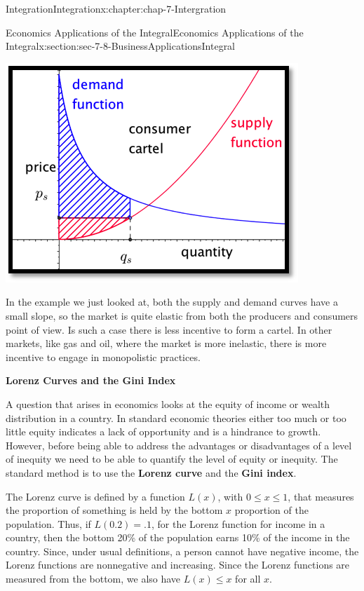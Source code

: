 \documentclass[oneside,10pt,]{book}
\newcommand{\terminology}[1]{\textbf{#1}}
\numberwithin{equation}{section}
\begin{document}
\begin{chapterptx}{Integration}{}{Integration}{}{}{x:chapter:chap-7-Intergration}
\begin{sectionptx}{Economics Applications of the Integral}{}{Economics Applications of the Integral}{}{}{x:section:sec-7-8-BusinessApplicationsIntegral}
\begin{sidebyside}{1}{0.2}{0.2}{0}
\begin{sbspanel}{0.6}
\includegraphics[width=\linewidth]{images/sec7-8-14.png}
\end{sbspanel}%
\end{sidebyside}%
\par
In the example we just looked at, both the supply and demand curves have a small slope, so the market is quite elastic from both the producers and consumers point of view.  Is such a case there is less incentive to form a cartel.  In other markets, like gas and oil, where the market is more inelastic, there is more incentive to engage in monopolistic practices.%
\par
\terminology{Lorenz Curves and the Gini Index}%
\par
A question that arises in economics looks at the equity of income or wealth distribution in a country.  In standard economic theories either too much or too little equity indicates a lack of opportunity and is a hindrance to growth.  However, before being able to address the advantages or disadvantages of a level of inequity we need to be able to quantify the level of equity or inequity.  The standard method is to use the \terminology{Lorenz curve} and the \terminology{Gini index}.%
\par
The Lorenz curve is defined by a function \(L(x)\), with \(0\le x\le 1\), that measures the proportion of something is held by the bottom \(x\) proportion of the population.  Thus, if \(L(0.2)=.1\), for the Lorenz function for income in a country, then the bottom 20\% of the population earns 10\% of the income in the country.  Since, under usual definitions, a person cannot have negative income, the Lorenz functions are nonnegative and increasing.  Since the Lorenz functions are measured from the bottom, we also have \(L(x)\le x\) for all \(x\).%

\end{sectionptx}
\end{chapterptx}
\end{document}

